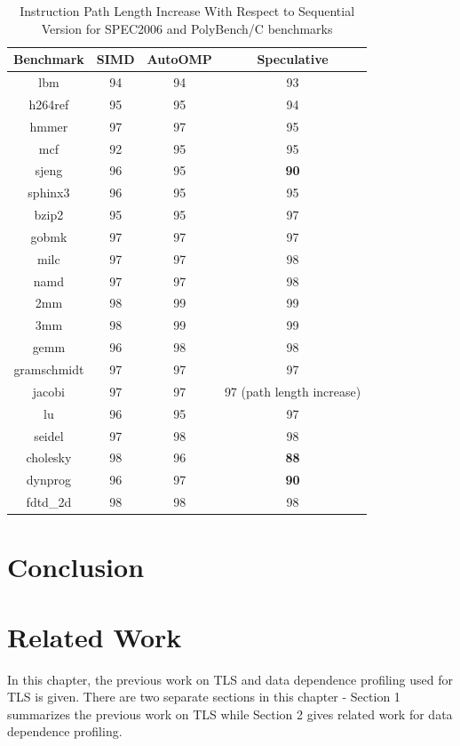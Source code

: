 \documentclass[10pt]{report}          %
\begin{document}
\begin{table}
\centering
\caption{Instruction Path Length Increase With Respect to Sequential Version for SPEC2006 and PolyBench/C benchmarks}
\begin{tabular}{|c||c|c|c|} \hline
Benchmark & SIMD & AutoOMP & Speculative\\ \hline 
lbm & 94 & 94 & 93\\ \hline
h264ref & 95 & 95 & 94 \\ \hline
hmmer  & 97 & 97 & 95  \\ \hline
mcf  & 92 & 95 & 95 \\ \hline
sjeng  & 96 & 95 & \textbf{90} \\ \hline
sphinx3  & 96 & 95 & 95  \\ \hline
bzip2 & 95 & 95 & 97  \\ \hline
gobmk  & 97 & 97 & 97  \\ \hline
milc  & 97 & 97 & 98  \\ \hline
namd & 97 & 97 & 98  \\ \hline
2mm	& 98 & 99 & 99 \\ \hline
3mm	 & 98 & 99 & 99 \\ \hline
gemm	  & 96 & 98 & 98\\ \hline
gramschmidt	 & 97 & 97 & 97 \\ \hline
jacobi & 97 & 97 & 97 (path length increase) \\ \hline
lu	 & 96 & 95 & 97 \\ \hline
seidel&	 97 & 98 & 98\\ \hline
cholesky  & 98 & 96 & \textbf{88}\\ \hline
dynprog& 96 & 97 & \textbf{90}\\ \hline
fdtd\_2d  & 98 & 98 & 98 \\ \hline
\hline\end{tabular}
\label{table:spec_committed}
\end{table}


\chapter{Conclusion}
\chapter{Related Work}

In this chapter, the previous work on TLS and data dependence profiling used for TLS is given.  There are two separate sections in this chapter - Section 1 summarizes the previous work on TLS while Section 2 gives related work for data dependence profiling.
\end{document}
